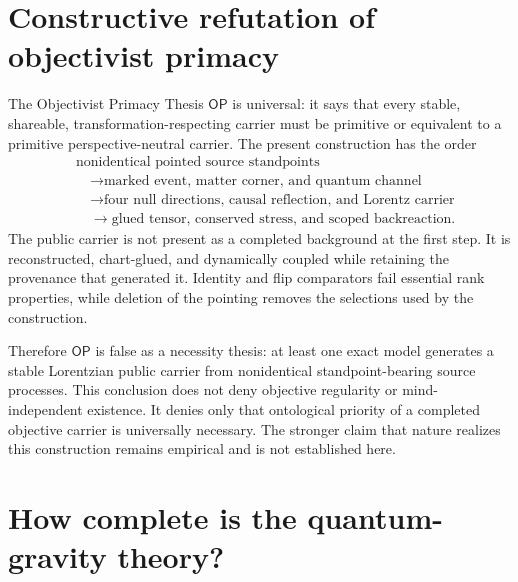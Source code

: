 \documentclass[11pt]{article}
\theoremstyle{definition}
\theoremstyle{remark}
\newcommand{\OPT}{\mathsf{OP}}
\begin{document}
\section{Constructive refutation of objectivist primacy}

The Objectivist Primacy Thesis $\OPT$ is universal: it says that every stable, shareable, transformation-respecting carrier must be primitive or equivalent to a primitive perspective-neutral carrier. The present construction has the order
\begin{equation}
 \begin{aligned}
 &\text{nonidentical pointed source standpoints}\\
 &\quad\longrightarrow\text{marked event, matter corner, and quantum channel}\\
 &\quad\longrightarrow\text{four null directions, causal reflection, and Lorentz carrier}\\
 &\quad\longrightarrow\text{glued tensor, conserved stress, and scoped backreaction}.
 \end{aligned}
\end{equation}
The public carrier is not present as a completed background at the first step. It is reconstructed, chart-glued, and dynamically coupled while retaining the provenance that generated it. Identity and flip comparators fail essential rank properties, while deletion of the pointing removes the selections used by the construction.

Therefore $\OPT$ is false as a necessity thesis: at least one exact model generates a stable Lorentzian public carrier from nonidentical standpoint-bearing source processes. This conclusion does not deny objective regularity or mind-independent existence. It denies only that ontological priority of a completed objective carrier is universally necessary. The stronger claim that nature realizes this construction remains empirical and is not established here.

\section{How complete is the quantum-gravity theory?}
\end{document}
